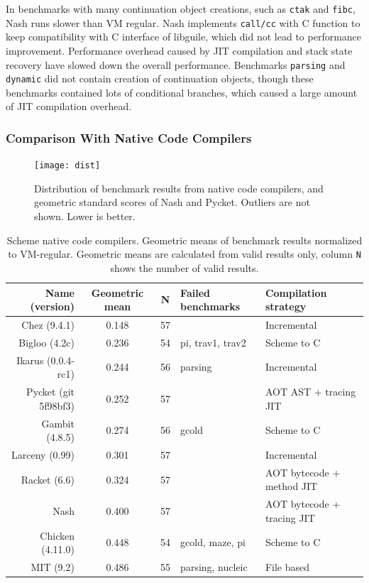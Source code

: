 \documentclass[preprint, 10pt]{sigplanconf}
\begin{document}
In benchmarks with many continuation object creations, such as \texttt{ctak} and
\texttt{fibc}, Nash runs slower than VM regular. Nash implements
\texttt{call/cc} with C function to keep compatibility with C interface of
libguile, which did not lead to performance improvement.  Performance overhead
caused by JIT compilation and stack state recovery have slowed down the overall
performance.  Benchmarks \texttt{parsing} and \texttt{dynamic} did not contain
creation of continuation objects, though these benchmarks contained lots of
conditional branches, which caused a large amount of JIT compilation overhead.

\subsubsection{Comparison With Native Code Compilers}

\begin{figure}
  \centering
  \texttt{[image: dist]}
  \caption{Distribution of benchmark results from native code compilers, and
    geometric standard scores of Nash and Pycket.  Outliers are not shown. Lower
    is better.}
  \label{fig:dist}
\end{figure}

\begin{table}
  \centering
  \begin{tabular}{rccll}
    Name (version) & Geometric mean & N & Failed benchmarks & Compilation
    strategy \\
    \toprule
    Chez (9.4.1) &  0.148 & 57 & & Incremental \\
    Bigloo (4.2c) & 0.236 & 54 & pi, trav1, trav2 & Scheme to C \\
    Ikarus (0.0.4-rc1) & 0.244 & 56 & parsing & Incremental \\
    Pycket (git 5f98bf3) & 0.252 & 57 & & AOT AST + tracing JIT \\
    Gambit (4.8.5) & 0.274 & 56 & gcold & Scheme to C \\
    Larceny (0.99) &  0.301 & 57 & & Incremental \\
    Racket  (6.6) &  0.324 & 57 & & AOT bytecode + method JIT \\
    Nash & 0.400 & 57 & & AOT bytecode + tracing JIT \\
    Chicken (4.11.0) & 0.448 & 54 & gcold, maze, pi & Scheme to C \\
    MIT (9.2) &  0.486 & 55 & parsing, nucleic & File based \\
  \end{tabular}
  \caption{Scheme native code compilers. Geometric means of benchmark results
    normalized to VM-regular. Geometric means are calculated from valid results
    only, column \texttt{N} shows the number of valid results.}
\label{tab:nativecomp}
\end{table}
\end{document}
